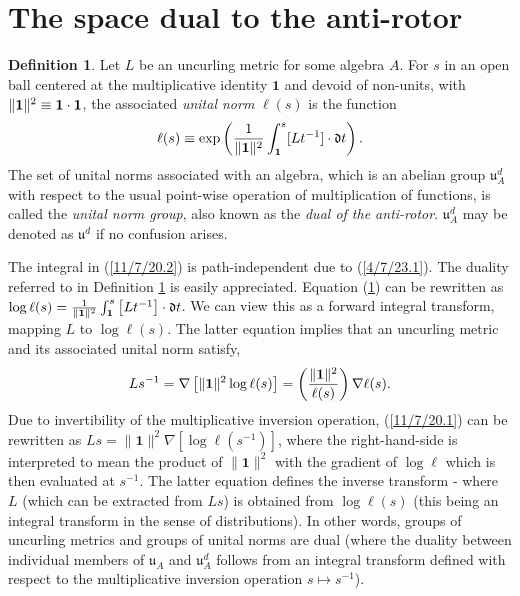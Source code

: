 \documentclass{amsart}
\numberwithin{equation}{section}
\theoremstyle{definition}
\newtheorem{definition}[theorem]{Definition}
\numberwithin{theorem}{section}
\begin{document}
\section{The space dual to the anti-rotor}
\enlargethispage{1cm}
  \begin{definition}\label{9/21/23.2} Let $L$ be an uncurling metric for some algebra $A$.  For $s$ in an open ball centered at the multiplicative identity $\mathbf{1}$ and devoid of non-units, with $\|{\bf 1}\|^2 \equiv \mathbf{1}\cdot\mathbf{1}$, the associated {\it unital norm} $ \ell(s)$ is the function 
  \begin{equation}\label{11/7/20.2}   \ell(s) \equiv \exp\left(\frac{1}{\|{\bf 1}\|^2}\int_{\bf 1}^s [Lt^{-1}]\cdot \mathfrak{d}t\right).\end{equation} 
   The set of unital norms associated with an algebra, which is an abelian group $\mathfrak{u}^d_A$ with respect to the usual point-wise operation of multiplication of functions, is called the {\it unital norm group}, also known as the {\it dual of the anti-rotor}. $\mathfrak{u}^d_A$ may be denoted as $\mathfrak{u}^d$ if no confusion arises. \end{definition} 
   
   
The integral in (\ref{11/7/20.2}) is path-independent due to (\ref{4/7/23.1}).  The duality referred to in Definition \ref{9/21/23.2} is easily appreciated.  Equation (\ref{9/21/23.2}) can be rewritten as  \mbox{$\log\ell(s) = \frac{1}{\|\mathbf{1}\|^2}\int_{{\bf 1}}^{s} \left[L t^{-1}\right]\cdot \mathfrak{d}t$.}   We can view this as a forward integral transform, mapping $L$ to $\log \ell(s)$.   The latter equation implies that an uncurling metric and its associated unital norm satisfy,  \begin{equation}\label{11/7/20.1} Ls^{-1}  = \nabla\left[\|{\bf 1}\|^2\log  \ell(s)\right] =   \left(\frac{\|{\bf 1}\|^2}{ \ell(s)}\right)\nabla \ell(s).\end{equation}  Due to invertibility of the multiplicative inversion operation,  (\ref{11/7/20.1}) can be rewritten as  $Ls = \|\mathbf{1}\|^2 \nabla\left[\log \ell(s^{-1})\right]$, where the right-hand-side is interpreted to mean the product of $\|\mathbf{1}\|^2$ with the gradient of $\log \ell$ which is then evaluated at $s^{-1}$.  The latter equation defines the inverse transform - where $L$ (which can be extracted from $Ls$) is obtained from $\log\ell(s)$ (this being an integral transform in the sense of distributions).  
In other words, groups of uncurling metrics and groups of unital norms are dual (where the duality between individual members of  $\mathfrak{u}_A$ and $\mathfrak{u}_A^d$ follows from an integral transform defined with respect to the multiplicative inversion operation $s\mapsto s^{-1}$).
   
\end{document}
